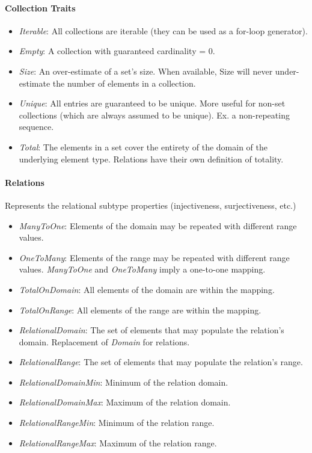 \paragraph{Collection Traits}
\begin{itemize}
    \item \textit{Iterable}: All collections are iterable (they can be used as a for-loop generator).
    \item \textit{Empty}: A collection with guaranteed cardinality = 0.
    \item \textit{Size}: An over-estimate of a set's size. When available, Size will never under-estimate the number of elements in a collection.
    \item \textit{Unique}: All entries are guaranteed to be unique. More useful for non-set collections (which are always assumed to be unique). Ex. a non-repeating sequence.
    \item \textit{Total}: The elements in a set cover the entirety of the domain of the underlying element type. Relations have their own definition of totality.
\end{itemize}

\paragraph{Relations}
Represents the relational subtype properties (injectiveness, surjectiveness, etc.)
\begin{itemize}
    \item \textit{ManyToOne}: Elements of the domain may be repeated with different range values.
    \item \textit{OneToMany}: Elements of the range may be repeated with different range values. \textit{ManyToOne} and \textit{OneToMany} imply a one-to-one mapping.
    \item \textit{TotalOnDomain}: All elements of the domain are within the mapping.
    \item \textit{TotalOnRange}: All elements of the range are within the mapping.
    \item \textit{RelationalDomain}: The set of elements that may populate the relation's domain. Replacement of \textit{Domain} for relations.
    \item \textit{RelationalRange}: The set of elements that may populate the relation's range.
    \item \textit{RelationalDomainMin}: Minimum of the relation domain.
    \item \textit{RelationalDomainMax}: Maximum of the relation domain.
    \item \textit{RelationalRangeMin}: Minimum of the relation range.
    \item \textit{RelationalRangeMax}: Maximum of the relation range.
\end{itemize}

